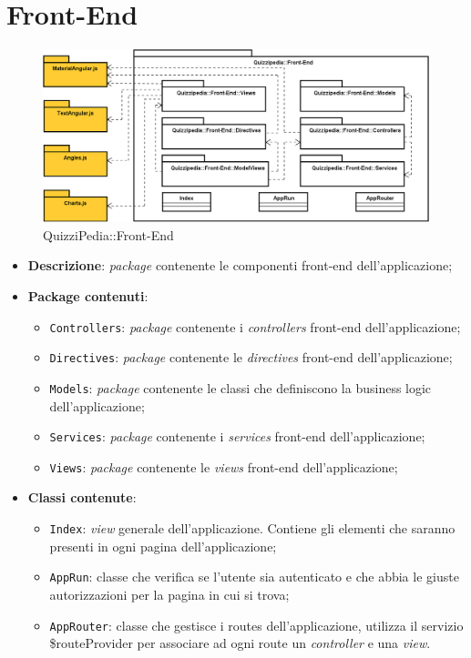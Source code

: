 \newpage
\section{Front-End}
\label{QuizziPedia::Front-End}
\begin{figure}[ht]
	\centering
	\includegraphics[scale=0.35]{UML/Package/QuizziPedia_Front-end.png}
	\caption{QuizziPedia::Front-End}
\end{figure}
\FloatBarrier
\begin{itemize}
	\item \textbf{Descrizione}: \textit{package} contenente le componenti front-end dell'applicazione;
	\item \textbf{Package contenuti}:
	\begin{itemize}
		\item \texttt{Controllers}: \textit{package} contenente i \textit{controllers} front-end dell'applicazione;
		\item \texttt{Directives}: \textit{package} contenente le \textit{directives} front-end dell'applicazione;
		\item \texttt{Models}: \textit{package} contenente le classi che definiscono la business logic dell'applicazione;
		\item \texttt{Services}: \textit{package} contenente i \textit{services} front-end dell'applicazione;
		\item \texttt{Views}: \textit{package} contenente le \textit{views} front-end dell'applicazione;
	\end{itemize}
	\item \textbf{Classi contenute}:
	\begin{itemize}
		\item \texttt{Index}: \textit{view} generale dell'applicazione. Contiene gli elementi che saranno presenti in ogni pagina dell'applicazione;
		\item \texttt{AppRun}: classe che verifica se l'utente sia autenticato e che abbia le giuste autorizzazioni per la pagina in cui si trova;
		\item \texttt{AppRouter}: classe che gestisce i routes dell'applicazione, utilizza il servizio \$routeProvider per associare ad ogni route un \textit{controller} e una \textit{view}.
	\end{itemize}
\end{itemize}


